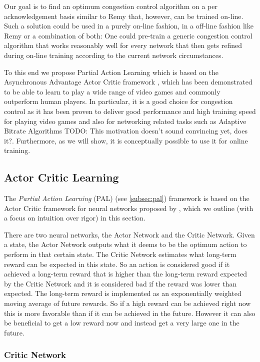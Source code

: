 \documentclass[sigconf]{acmart}
\newcommand\note[2]{{\color{#1}#2}}
\newcommand\todo[1]{{\note{red}{TODO: #1}}}
\begin{document}
Our goal is to find an optimum congestion control algorithm on a per acknowledgement basis similar to Remy that, however, can be trained on-line.  Such a solution could be used in a purely on-line fashion, in a off-line fashion like Remy or a combination of both: One could pre-train a generic congestion control algorithm that works reasonably well for every network that then gets refined during on-line training according to the current network circumstances. 

To this end we propose Partial Action Learning which is based on the Asynchronous Advantage Actor Critic framework \cite{mnih_asynchronous_2016}, which has been demonstrated to be able to learn to play a wide range of video games and commonly outperform human players. In particular, it is a good choice for congestion control as it has been proven to deliver good performance and high training speed for playing video games and also for networking related tasks such as Adaptive Bitrate Algorithms \cite{mao_neural_2017} \todo{This motivation doesn't sound convincing yet, does it?}. Furthermore, as we will show, it is conceptually possible to use it for online training. 

\subsection{Actor Critic Learning}
\label{subsec:ac}

The \textit{Partial Action Learning} (PAL) (see \ref{subsec:pal}) framework is based on the Actor Critic framework for neural networks proposed by \citet{mnih_asynchronous_2016}, which we outline (with a focus on intuition over rigor) in this section. 

There are two neural networks, the Actor Network and the Critic Network. Given a state, the Actor Network outputs what it deems to be the optimum action to perform in that certain state. The Critic Network estimates what long-term reward can be expected in this state. So an action is considered good if it achieved a long-term reward that is higher than the long-term reward expected by the Critic Network and it is considered bad if the reward was lower than expected. The long-term reward is implemented as an exponentially weighted moving average of future rewards. So if a high reward can be achieved right now this is more favorable than if it can be achieved in the future. However it can also be beneficial to get a low reward now and instead get a very large one in the future. 

\subsubsection{Critic Network}
\label{subsubsec:genericvalue}
\end{document}
